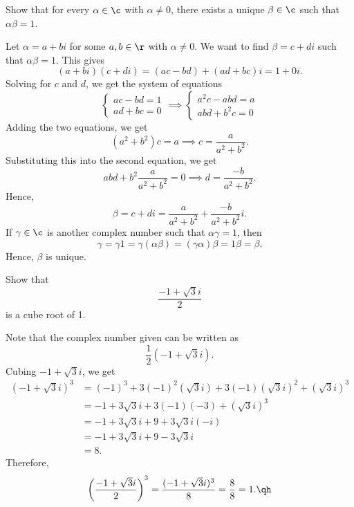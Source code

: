\begin{exercise}[1a6]
    Show that for every $\alpha \in \c$ with $\alpha \neq 0$, there exists a unique $\beta \in \c$ such that $\alpha\beta = 1$.
\end{exercise}

\begin{sol}
    Let $\alpha = a + bi$ for some $a, b \in \r$ with $\alpha \neq 0$. We want to find $\beta = c + di$ such that $\alpha\beta = 1$. This gives
    \[(a + bi)(c + di) = (ac - bd) + (ad + bc)i = 1 + 0i.\]
    Solving for $c$ and $d$, we get the system of equations
    \[\begin{cases}
        ac - bd = 1 \\
        ad + bc = 0
    \end{cases} \implies
    \begin{cases}
        a^2c - abd = a \\
        abd + b^2c = 0
    \end{cases}\]
    Adding the two equations, we get
    \[(a^2 + b^2)c = a \implies c = \frac{a}{a^2 + b^2}.\]
    Substituting this into the second equation, we get
    \[abd + b^2\frac{a}{a^2 + b^2} = 0 \implies d = \frac{-b}{a^2 + b^2}.\]
    Hence,
    \[\beta = c + di = \frac{a}{a^2 + b^2} + \frac{-b}{a^2 + b^2}i.\]
    If $\gamma \in \c$ is another complex number such that $\alpha\gamma = 1$, then
    \[\gamma = \gamma 1 = \gamma (\alpha\beta) = (\gamma\alpha) \beta = 1\beta = \beta.\]
    Hence, $\beta$ is unique.
\end{sol}

\begin{exercise}[1a7]
    Show that
    \[\frac{-1 + \sqrt3i}{2}\]
    is a cube root of 1.
\end{exercise}

\begin{sol}
    Note that the complex number given can be written as
    \[\frac 12(-1 + \sqrt3i).\]
    Cubing $-1 + \sqrt3i$, we get
    \begin{align*}
        (-1 + \sqrt 3i)^3 & = (-1)^3 + 3(-1)^2(\sqrt3i) + 3(-1)(\sqrt3i)^2 + (\sqrt3i)^3 \\
        & = -1 + 3\sqrt3i + 3(-1)(-3) + (\sqrt3i)^3 \\
        & = -1 + 3\sqrt3i + 9 + 3\sqrt3i(-i) \\
        & = -1 + 3\sqrt3i + 9 - 3\sqrt3i \\
        & = 8.
    \end{align*}
    Therefore,
    \[\left(\frac{-1 + \sqrt3i}{2}\right)^3 = \frac{(-1 + \sqrt3i)^3}{8} = \frac{8}{8} = 1. \qh\]
\end{sol}

